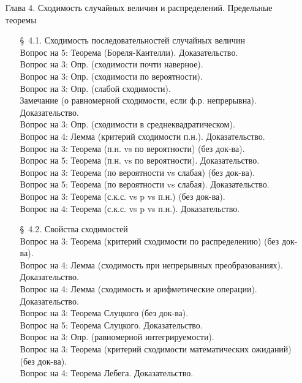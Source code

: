 \documentclass[10pt]{amsart}
\begin{document}
\begin{enumerate}
    
\item[Глава 4.] Сходимость случайных величин и распределений. Предельные теоремы \\
\begin{enumerate}
\item[\S\, 4.1.] Сходимость последовательностей случайных величин \\
Вопрос на 5: Теорема (Бореля-Кантелли). Доказательство. \\
Вопрос на 3: Опр. (сходимости почти наверное). \\
Вопрос на 3: Опр. (сходимости по вероятности). \\
Вопрос на 3: Опр. (слабой сходимости). \\
Замечание (о равномерной сходимости, если ф.р. непрерывна). Доказательство. \\
Вопрос на 3: Опр. (сходимости в среднеквадратическом). \\
Вопрос на 4: Лемма (критерий сходимости п.н.). Доказательство. \\
Вопрос на 3: Теорема (п.н. vs по вероятности)  (без док-ва). \\
Вопрос на 5: Теорема (п.н. vs по вероятности). Доказательство. \\
Вопрос на 3: Теорема (по вероятности vs слабая) (без док-ва). \\  
Вопрос на 5: Теорема (по вероятности vs слабая). Доказательство. \\  
Вопрос на 3: Теорема (с.к.с. vs p vs п.н.) (без док-ва). \\ 
Вопрос на 4: Теорема (с.к.с. vs p vs п.н.). Доказательство. \\ 

        
        
\item[\S\, 4.2.] Свойства сходимостей \\
        
Вопрос на 3: Теорема (критерий сходимости по распределению) (без док-ва). \\
Вопрос на 4: Лемма  (сходимость при непрерывных преобразованиях). Доказательство. \\
Вопрос на 4: Лемма (сходимость и арифметические операции). Доказательство. \\
Вопрос на 3: Теорема Слуцкого (без док-ва). \\
Вопрос на 5: Теорема Слуцкого. Доказательство. \\
Вопрос на 3: Опр. (равномерной интегрируемости). \\
Вопрос на 3: Теорема (критерий сходимости математических ожиданий) (без док-ва). \\
Вопрос на 4: Теорема Лебега. Доказательство. \\


\end{enumerate}
\end{enumerate}
\end{document}
